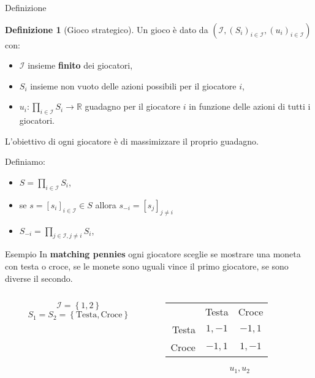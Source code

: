\documentclass{beamer}
\newcounter{counter1}
\theoremstyle{plain}
\theoremstyle{definition}
\newtheorem{mydef}[counter1]{Definizione}
\theoremstyle{remark}
\newcommand{\set}[1]{\left\{#1\right\}}
\newcommand{\pa}[1]{\left(#1\right)}
\newcommand{\bra}[1]{\left[#1\right]}
\begin{document}
\begin{frame}{Definizione}
  \begin{mydef}[Gioco strategico]
    Un gioco è dato da $\pa{\mathcal{I},\pa{S_i}_{i\in\mathcal{I}},
      \pa{u_i}_{i\in\mathcal{I}}}$ con:
    \begin{itemize}
    \item $\mathcal{I}$ insieme \textbf{finito} dei giocatori,
    \item $S_i$ insieme non vuoto delle azioni possibili per il
      giocatore $i$,
    \item $u_i: \prod _{i\in\mathcal{I}} S_i \to \mathbb{R}$ guadagno
      per il giocatore $i$ in funzione delle azioni di tutti i
      giocatori.
    \end{itemize}
  \end{mydef}
  L'obiettivo di ogni giocatore è di massimizzare il proprio guadagno.

  Definiamo:
  \begin{itemize}
  \item $S = \prod _{i\in\mathcal{I}} S_i$,
  \item se $s = \bra{s_i}_{i\in\mathcal{I}} \in S$ allora $s_{-i} =
    \bra{s_j}_{j\neq i}$
  \item $\displaystyle S_{-i} = \prod _{j\in\mathcal{I},j\neq i} S_i$,
  \end{itemize}
\end{frame}

\begin{frame}{Esempio}
  In \textbf{matching pennies} ogni giocatore sceglie se mostrare una
  moneta con testa o croce, se le monete sono uguali vince il primo
  giocatore, se sono diverse il secondo.
  
  \begin{columns}[T]
    \begin{column}{0.4\textwidth}
      \[ \mathcal{I} = \set{1,2} \]
      \[ S_1 = S_2 = \set{\text{Testa},\text{Croce}} \]
    \end{column}
    \begin{column}{0.4\textwidth}
      \begin{tabular}{rcc}
        & Testa & Croce \\
        \cline{2-3}
        Testa & \multicolumn{1}{|c|}{$1,-1$} & \multicolumn{1}{|c|}{$-1,1$}  \\
        \cline{2-3}
        Croce & \multicolumn{1}{|c|}{$-1,1$} & \multicolumn{1}{|c|}{$1,-1$}  \\
        \cline{2-3}
      \end{tabular}
      \[ u_1,u_2 \]
    \end{column}
  \end{columns}
\end{frame}
\end{document}
